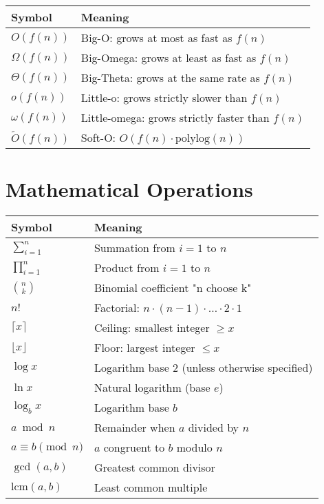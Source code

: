 \begin{center}
\begin{tabular}{|l|l|}
\hline
\textbf{Symbol} & \textbf{Meaning} \\
\hline
$O(f(n))$ & Big-O: grows at most as fast as $f(n)$ \\
$\Omega(f(n))$ & Big-Omega: grows at least as fast as $f(n)$ \\
$\Theta(f(n))$ & Big-Theta: grows at the same rate as $f(n)$ \\
$o(f(n))$ & Little-o: grows strictly slower than $f(n)$ \\
$\omega(f(n))$ & Little-omega: grows strictly faster than $f(n)$ \\
$\tilde{O}(f(n))$ & Soft-O: $O(f(n) \cdot \text{polylog}(n))$ \\
\hline
\end{tabular}
\end{center}

\section{Mathematical Operations}

\begin{center}
\begin{tabular}{|l|l|}
\hline
\textbf{Symbol} & \textbf{Meaning} \\
\hline
$\sum_{i=1}^n$ & Summation from $i=1$ to $n$ \\
$\prod_{i=1}^n$ & Product from $i=1$ to $n$ \\
$\binom{n}{k}$ & Binomial coefficient "n choose k" \\
$n!$ & Factorial: $n \cdot (n-1) \cdot \ldots \cdot 2 \cdot 1$ \\
$\lceil x \rceil$ & Ceiling: smallest integer $\geq x$ \\
$\lfloor x \rfloor$ & Floor: largest integer $\leq x$ \\
$\log x$ & Logarithm base 2 (unless otherwise specified) \\
$\ln x$ & Natural logarithm (base $e$) \\
$\log_b x$ & Logarithm base $b$ \\
$a \bmod n$ & Remainder when $a$ divided by $n$ \\
$a \equiv b \pmod{n}$ & $a$ congruent to $b$ modulo $n$ \\
$\gcd(a,b)$ & Greatest common divisor \\
$\text{lcm}(a,b)$ & Least common multiple \\
\hline
\end{tabular}
\end{center}

